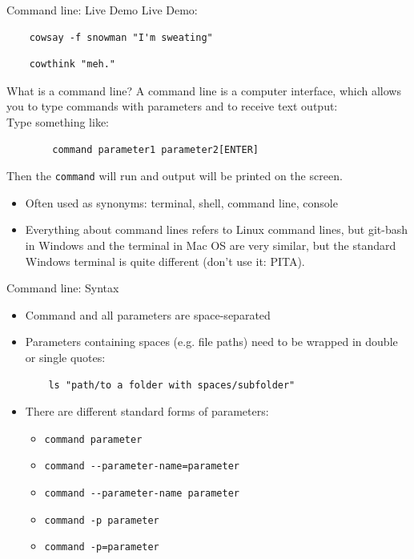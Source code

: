 \begin{frame}[fragile]{Command line: Live Demo}
    Live Demo:
    \begin{verbatim}
    cowsay -f snowman "I'm sweating"
    \end{verbatim}
    \begin{verbatim}
    cowthink "meh."
    \end{verbatim}
\end{frame}

\begin{frame}[fragile]{What is a command line?}
    A command line is a computer interface, which allows you to type commands with parameters
    and to receive text output\pause:\\

    Type something like:
    \begin{verbatim}
        command parameter1 parameter2[ENTER]\end{verbatim}
    Then the \verb|command| will run and output will be printed on the screen.
    \bigskip
    \pause
    \begin{itemize}
        \item Often used as synonyms: terminal, shell, command line, console
        \item Everything about command lines refers to Linux command lines, but git-bash in Windows
            and the terminal in Mac OS are very similar, but the standard Windows terminal is quite different
            (don't use it: PITA).
    \end{itemize}
\end{frame}

\begin{frame}[fragile]{Command line: Syntax}

    \begin{itemize}
        \item Command and all parameters are space-separated\pause
        \item Parameters containing spaces (e.g. file paths) need to be wrapped in double or single
            quotes:
            \begin{verbatim}
    ls "path/to a folder with spaces/subfolder"\end{verbatim}\pause
        \item There are different standard forms of parameters:
        \begin{itemize}
            \item \verb|command parameter|
            \item \verb|command --parameter-name=parameter|
            \item \verb|command --parameter-name parameter|
            \item \verb|command -p parameter|
            \item \verb|command -p=parameter|
        \end{itemize}
    \end{itemize}


\end{frame}


